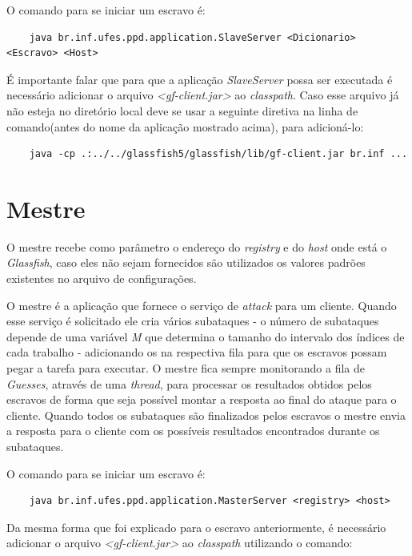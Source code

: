 \documentclass[
	12pt,				%
    oneside,			%
	a4paper,			%
	english,			%
	brazil,				%
	]{abntex2}
\begin{document}
O comando para se iniciar um escravo é:

\begin{lstlisting}
	java br.inf.ufes.ppd.application.SlaveServer <Dicionario> <Escravo> <Host>
\end{lstlisting}

É importante falar que para que a aplicação \textit{SlaveServer} possa ser executada é necessário adicionar o arquivo \textit{<gf-client.jar>} ao \textit{classpath}. Caso esse arquivo já não esteja no diretório local deve se usar a seguinte diretiva na linha de comando(antes do nome da aplicação mostrado acima), para adicioná-lo:

\begin{lstlisting}
	java -cp .:../../glassfish5/glassfish/lib/gf-client.jar br.inf ...
\end{lstlisting}


\section{Mestre}

O mestre recebe como parâmetro o endereço do \textit{registry} e do \textit{host} onde está o \textit{Glassfish}, caso eles não sejam fornecidos são utilizados os valores padrões existentes no arquivo de configurações.

O mestre é a aplicação que fornece o serviço de \textit{attack} para um cliente. Quando esse serviço é solicitado
ele cria vários subataques - o número de subataques depende de uma variável \textit{M} que determina o tamanho do intervalo dos índices de cada trabalho - adicionando os na respectiva fila para que os escravos possam pegar a tarefa para executar.
O mestre fica sempre monitorando a fila de \textit{Guesses}, através de uma \textit{thread}, para processar os resultados obtidos pelos escravos de forma que seja possível montar a resposta ao final do ataque para o cliente.
Quando todos os subataques são finalizados pelos escravos o mestre envia a resposta para o cliente com os possíveis resultados encontrados durante os subataques.

O comando para se iniciar um escravo é:

\begin{lstlisting}
	java br.inf.ufes.ppd.application.MasterServer <registry> <host>
\end{lstlisting}

Da mesma forma que foi explicado para o escravo anteriormente, é necessário adicionar o arquivo \textit{<gf-client.jar>} ao \textit{classpath} utilizando o comando:
\end{document}
